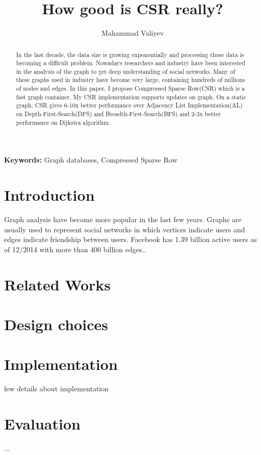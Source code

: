 \documentclass{article}
\title{How good is CSR really?}
\author{Mahammad Valiyev}
\begin{document}
\maketitle

\begin{abstract}
  In the last decade, the data size is growing exponentially and processing those data is becoming a difficult problem. Nowadays researchers and industry have been interested in the analysis of the graph to get deep understanding of social networks. Many of these graphs used in industry have become very large, containing hundreds of millions of nodes and edges. In this paper, I propose Compressed Sparse Row(CSR) which is a fast graph container. My CSR implementation supports updates on graph. On a static graph, CSR gives 6-10x better performance over Adjacency List Implementation(AL) on Depth-First-Search(DFS) and Breadth-First-Search(BFS) and 2-3x better performance on Dijkstra algorithm.
\end{abstract}
\textbf{Keywords:} Graph databases, Compressed Sparse Row

\section{Introduction}
\label{introduction}
Graph analysis have become more popular in the last few years. Graphs are usually used to represent social networks in which vertices indicate users and edges indicate friendship between users. Facebook has 1.39 billion  active users as of 12/2014 with more than 400 billion edges.\cite{fb}.


\section{Related Works}

\section{Design choices}
\label{design}

\section{Implementation}
 few details about implementation



\section{Evaluation}
...
\end{document}
